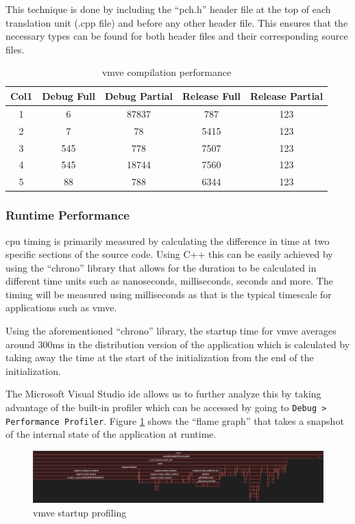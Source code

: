 \documentclass[11pt]{article}
\begin{document}
This technique is done by including the ``pch.h'' header file at the top of each
translation unit (.cpp file) and before any other header file. This ensures that
the necessary types can be found for both header files and their corresponding
source files.

\begin{table}[H]
\centering
\begin{tabular}{||c c c c c ||} 
  \hline
  Col1 & Debug Full & Debug Partial  & Release Full & Release Partial \\ [0.5ex] 
  \hline\hline
  1 & 6 & 87837 & 787 & 123 \\ 
  2 & 7 & 78 & 5415 & 123 \\
  3 & 545 & 778 & 7507 & 123 \\
  4 & 545 & 18744 & 7560 & 123  \\
  5 & 88 & 788 & 6344 & 123 \\ [1ex] 
  \hline
\end{tabular}
\caption{\gls*{vmve} compilation performance}
\label{fig:compilation_performance}
\end{table}



\subsubsection{Runtime Performance}
\gls*{cpu} timing is primarily measured by calculating the difference in time at
two specific sections of the source code. Using C++ this can be easily achieved
by using the ``chrono'' library that allows for the duration to be calculated in
different time units such as nanoseconds, milliseconds, seconds and more. The
timing will be measured using milliseconds as that is the typical timescale for
applications such as \gls*{vmve}.

Using the aforementioned ``chrono'' library, the startup time for \gls*{vmve}
averages around 300ms in the distribution version of the application which is
calculated by taking away the time at the start of the initialization from the
end of the initialization.

The Microsoft Visual Studio \gls*{ide} allows us to further analyze this by
taking advantage of the built-in profiler which can be accessed by going to
\lstinline{Debug > Performance Profiler}. Figure
\ref{fig:vmve_startup_profiling} shows the ``flame graph'' that takes a snapshot
of the internal state of the application at runtime.

\begin{figure}[H]
  \centering
  \includegraphics[width=\textwidth]{images/startup_profiling_graph.png}
  \caption{\gls*{vmve} startup profiling}
  \label{fig:vmve_startup_profiling}
\end{figure}
\end{document}
